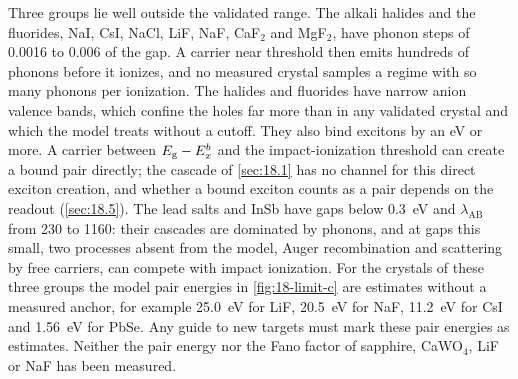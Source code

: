 Three groups lie well outside the validated range. The alkali halides and the fluorides, NaI, CsI, NaCl, LiF, NaF, CaF$_2$ and MgF$_2$, have phonon steps of 0.0016 to 0.006 of the gap. A carrier near threshold then emits hundreds of phonons before it ionizes, and no measured crystal samples a regime with so many phonons per ionization. The halides and fluorides have narrow anion valence bands, which confine the holes far more than in any validated crystal and which the model treats without a cutoff. They also bind excitons by an eV or more. A carrier between $E_{\mathrm{g}} - E_x^b$ and the impact-ionization threshold can create a bound pair directly; the cascade of \cref{sec:18.1} has no channel for this direct exciton creation, and whether a bound exciton counts as a pair depends on the readout (\cref{sec:18.5}). The lead salts and InSb have gaps below \SI{0.3}{eV} and $\lambda_{\mathrm{AB}}$ from 230 to 1160: their cascades are dominated by phonons, and at gaps this small, two processes absent from the model, Auger recombination and scattering by free carriers, can compete with impact ionization. For the crystals of these three groups the model pair energies in \cref{fig:18-limit-c} are estimates without a measured anchor, for example \SI{25.0}{eV} for LiF, \SI{20.5}{eV} for NaF, \SI{11.2}{eV} for CsI and \SI{1.56}{eV} for PbSe. Any guide to new targets must mark these pair energies as estimates. Neither the pair energy nor the Fano factor of sapphire, CaWO$_4$, LiF or NaF has been measured.
